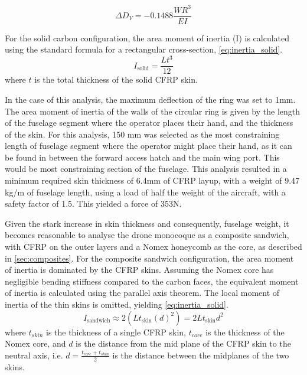 \begin{equation}
    \Delta D_V = -0.1488 \frac{WR^3}{EI}
    \label{eq: roark_ring_deflection}
\end{equation}

For the solid carbon configuration, the area moment of inertia (I) is calculated using the standard formula for a rectangular cross-section, \autoref{eq:inertia_solid}.
\begin{equation}
    I_{\text{solid}} = \frac{L t^3}{12}
    \label{eq:inertia_solid}
\end{equation}
where $t$ is the total thickness of the solid CFRP skin.

In the case of this analysis, the maximum deflection of the ring was set to 1mm. The area moment of inertia of the walls of the circular ring is given by the length of the fuselage segment where the operator places their hand, and the thickness of the skin. For this analysis, 150 mm was selected as the most constraining length of fuselage segment where the operator might place their hand, as it can be found in between the forward access hatch and the main wing port. This would be most constraining section of the fuselage. This analysis resulted in a minimum required skin thickness of 6.4mm of CFRP layup, with a weight of 9.47 kg/m of fuselage length, using a load of half the weight of the aircraft, with a safety factor of 1.5. This yielded a force of 353N.

Given the stark increase in skin thickness and consequently, fuselage weight, it becomes reasonable to analyse the drone monocoque as a composite sandwich, with CFRP on the outer layers and a Nomex honeycomb as the core, as described in \autoref{sec:composites}. For the composite sandwich configuration, the area moment of inertia is dominated by the CFRP skins. Assuming the Nomex core has negligible bending stiffness compared to the carbon faces, the equivalent moment of inertia is calculated using the parallel axis theorem. The local moment of inertia of the thin skins is omitted, yielding \autoref{eq:inertia_solid}.
\begin{equation}
    I_{\text{sandwich}} \approx 2 \left( L t_\text{skin} \left(d\right)^2 \right) = 2 L t_\text{skin} d^2
    \label{eq:inertia_sandwich}
\end{equation}
where $t_{skin}$ is the thickness of a single CFRP skin, $t_{core}$ is the thickness of the Nomex core, and $d$ is the distance from the mid plane of the CFRP skin to the neutral axis, i.e. $d = \frac{t_{core} + t_{skin}}{2}$ is the distance between the midplanes of the two skins.


